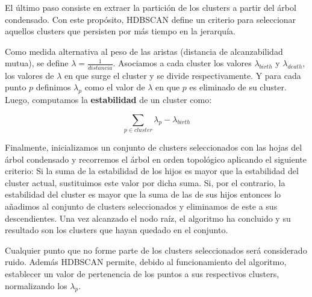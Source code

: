El último paso consiste en extraer la partición de los clusters a partir del árbol condensado.
Con este propósito, HDBSCAN define un criterio para seleccionar aquellos clusters que persisten por más tiempo en la jerarquía.

Como medida alternativa al peso de las aristas (distancia de alcanzabilidad mutua), se define $\lambda=\frac{1}{distancia}$.
Asociamos a cada cluster los valores $\lambda_{birth}$ y $\lambda_{death}$, los valores de $\lambda$ en que surge el cluster y se divide respectivamente.
Y para cada punto $p$ definimos $\lambda_p$ como el valor de $\lambda$ en que $p$ es eliminado de su cluster.
Luego, computamos la \textbf{estabilidad} de un cluster como:

\[
    \sum_{p\in cluster}{\lambda_p - \lambda_{birth}}
\]

Finalmente, inicializamos un conjunto de clusters seleccionados con las hojas del árbol condensado y recorremos el árbol en orden topológico aplicando el siguiente criterio:
Si la suma de la estabilidad de los hijos es mayor que la estabilidad del cluster actual, sustituimos este valor por dicha suma.
Si, por el contrario, la estabilidad del cluster es mayor que la suma de las de sus hijos entonces lo añadimos al conjunto de clusters seleccionados y eliminamos de este a sus descendientes.
Una vez alcanzado el nodo raíz, el algoritmo ha concluido y su resultado son los clusters que hayan quedado en el conjunto.

Cualquier punto que no forme parte de los clusters seleccionados será considerado ruido.
Además HDBSCAN permite, debido al funcionamiento del algoritmo, establecer un valor de pertenencia de los puntos a sus respectivos clusters, normalizando los $\lambda_p$.
